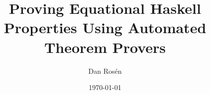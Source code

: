 \documentclass[serif,professionalfont]{beamer}
\title{Proving Equational Haskell Properties Using Automated Theorem Provers}
\author{Dan Rosén}
\date{\today}
\begin{document}
\maketitle


\makeatletter
\newcommand*{\rom}[1]{\text{\footnotesize\expandafter\@slowromancap\romannumeral #1@.}}
\newcommand*{\romnodot}[1]{\text{\footnotesize\expandafter\@slowromancap\romannumeral #1@}}
\makeatother

\newcommand\PA{\mathcal{P\!A}}
\newcommand\hs[1]{\verb~#1~}
\newcommand\ts[1]{\verb~#1~}
\newcommand\fn[1]{\mathrm{#1}}
\newcommand\ptr[1]{\fn{\operatorname{#1-ptr}}}
\newcommand\appfn{@}
\newcommand\app[2]{#1 \, \appfn \, #2}
\newcommand\appp[2]{(#1) \, \appfn \, #2}
\newcommand\ex[1]{\exists \, #1 \, . \,}
\newcommand\nexxx[3]{\nexists \, #1 , #2 , #3 . \,}
\newcommand\fa[1]{} %
\newcommand\faa[2]{} %
\newcommand\faaa[3]{} %
\newcommand\faaaaaa[6]{} %

\newcommand{\HRule}{\rule{\linewidth}{0.5mm}}%

\newcommand\fixb[0]{ ^{\bullet}}
\newcommand\fixw[0]{ ^{\circ}}

\newcommand\tofix[1]{#1^{\bullet}}
\newcommand\unfix[1]{#1^{\circ}}

\newcommand\append[0]{\texttt{\small{++}}}

\newcommand{\xsys}[2]{#1 \, xs \, #2 & = #1 \, ys #2}
\newcommand{\desca}[1]{  & \hspace{44.5mm}                            \{ \text{#1} \}}
\newcommand{\descra}[1]{ & \hspace{35mm} \Rightarrow     \hspace{4mm} \{ \text{#1} \}}
\newcommand{\descla}[1]{ & \hspace{35mm} \Leftarrow      \hspace{4mm} \{ \text{#1} \}}
\newcommand{\desclra}[1]{& \hspace{35mm} \Leftrightarrow \hspace{4mm} \{ \text{#1} \}}

\newcommand\lub[1]{\sqcup_{#1}}

\newcommand\defof[1]{definition of #1}

\newcommand\w[0]{\,\,}
\newcommand\eq[0]{ = }
\end{document}
